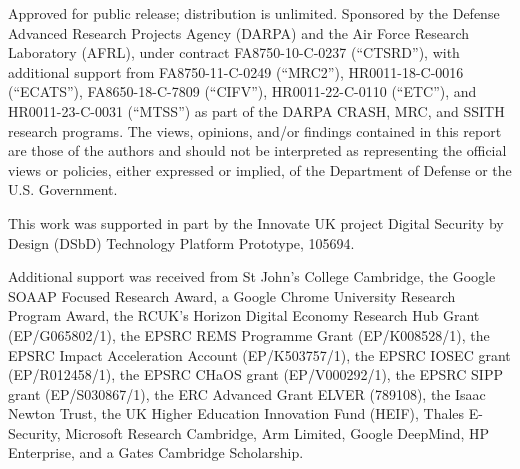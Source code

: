 \documentclass[12pt,twoside,openright,a4paper]{report}
\begin{document}
\ifdefined\trformat
\else
\begin{minipage}[h]{\textwidth}
  \vspace{-0.5cm}
  \maketitle

  {\footnotesize
    Approved for public release; distribution is unlimited.
    Sponsored by the Defense Advanced Research Projects Agency (DARPA) and the
    Air Force Research Laboratory (AFRL), under contract FA8750-10-C-0237
    (``CTSRD''), with additional support from FA8750-11-C-0249 (``MRC2''),
    HR0011-18-C-0016 (``ECATS''), FA8650-18-C-7809 (``CIFV''),
    HR0011-22-C-0110 (``ETC''), and HR0011-23-C-0031 (``MTSS'') as part of
    the DARPA CRASH, MRC, and SSITH research programs.
    The views, opinions, and/or findings contained in this report are those of
    the authors and should not be interpreted as representing the official
    views or policies, either expressed or implied, of the Department of
    Defense or the U.S. Government.

    \smallskip
    This work was supported in part by the Innovate UK project Digital
    Security by Design (DSbD) Technology Platform Prototype, 105694.

    \smallskip
    Additional support was received from St John's College Cambridge,
    the Google SOAAP Focused Research Award, a Google Chrome University
    Research Program Award, the RCUK's Horizon Digital Economy Research Hub
    Grant (EP/G065802/1), the EPSRC REMS Programme Grant (EP/K008528/1), the
    EPSRC Impact Acceleration Account (EP/K503757/1), the EPSRC IOSEC grant
    (EP/R012458/1), the EPSRC CHaOS grant (EP/V000292/1), the EPSRC SIPP grant
    (EP/S030867/1), the ERC Advanced Grant ELVER (789108), the Isaac Newton
    Trust, the UK Higher Education Innovation Fund (HEIF), Thales E-Security,
    Microsoft Research Cambridge, Arm Limited, Google DeepMind, HP Enterprise,
    and a Gates Cambridge Scholarship.

}
\end{minipage}
\fi

\normalsize

\ifdefined\trformat
\setcounter{page}{3}
\fi

\end{document}
